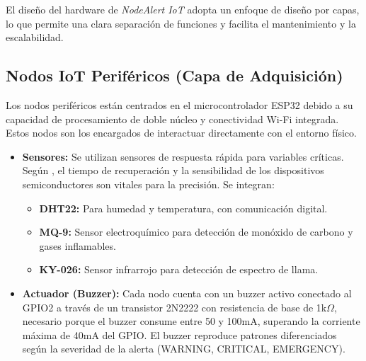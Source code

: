 
El diseño del hardware de \textit{NodeAlert IoT} adopta un enfoque de diseño por capas, lo que permite una clara separación de funciones y facilita el mantenimiento y la escalabilidad.

\subsection{Nodos IoT Periféricos (Capa de Adquisición)}
Los nodos periféricos están centrados en el microcontrolador ESP32 debido a su capacidad de procesamiento de doble núcleo y conectividad Wi-Fi integrada. Estos nodos son los encargados de interactuar directamente con el entorno físico.

\begin{itemize}
    \item \textbf{Sensores:} Se utilizan sensores de respuesta rápida para variables críticas. Según \citet{boylestad2009}, el tiempo de recuperación y la sensibilidad de los dispositivos semiconductores son vitales para la precisión. Se integran:
    \begin{itemize}
        \item \textbf{DHT22:} Para humedad y temperatura, con comunicación digital.
        \item \textbf{MQ-9:} Sensor electroquímico para detección de monóxido de carbono y gases inflamables.
        \item \textbf{KY-026:} Sensor infrarrojo para detección de espectro de llama.
    \end{itemize}
    \item \textbf{Actuador (Buzzer):} Cada nodo cuenta con un buzzer activo conectado al GPIO2 a través de un transistor 2N2222 con resistencia de base de 1k$\Omega$, necesario porque el buzzer consume entre 50 y 100mA, superando la corriente máxima de 40mA del GPIO. El buzzer reproduce patrones diferenciados seg\'un la severidad de la alerta (WARNING, CRITICAL, EMERGENCY).
\end{itemize}

